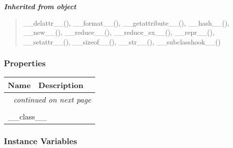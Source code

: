 \large{\textbf{\textit{Inherited from object}}}

\begin{quote}
\_\_delattr\_\_(), \_\_format\_\_(), \_\_getattribute\_\_(), \_\_hash\_\_(), \_\_new\_\_(), \_\_reduce\_\_(), \_\_reduce\_ex\_\_(), \_\_repr\_\_(), \_\_setattr\_\_(), \_\_sizeof\_\_(), \_\_str\_\_(), \_\_subclasshook\_\_()
\end{quote}


  \subsubsection{Properties}

    \vspace{-1cm}
\hspace{\varindent}\begin{longtable}{|p{\varnamewidth}|p{\vardescrwidth}|l}
\cline{1-2}
\cline{1-2} \centering \textbf{Name} & \centering \textbf{Description}& \\
\cline{1-2}
\endhead\cline{1-2}\multicolumn{3}{r}{\small\textit{continued on next page}}\\\endfoot\cline{1-2}
\endlastfoot\multicolumn{2}{|l|}{\textit{Inherited from object}}\\
\multicolumn{2}{|p{\varwidth}|}{\raggedright \_\_class\_\_}\\
\cline{1-2}
\end{longtable}



  \subsubsection{Instance Variables}

